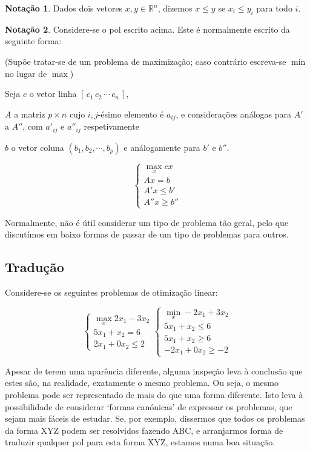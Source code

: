\documentclass{article}
\newcommand{\R}{\mathbb{R}}
\theoremstyle{definition}
\newtheorem*{notacao}{Notação}
\begin{document}
	\begin{notacao}
Dados dois vetores $x,y \in \R^n$, dizemos $x \leq y$ se $x_i \leq y_i$ para todo $i$.
	\end{notacao}
	\begin{notacao}
	Considere-se o pol escrito acima. Este é normalmente escrito da seguinte forma:
	
	(Supõe tratar-se de um problema de maximização; caso contrário escreva-se $\min$ no lugar de $\max$)
	
	Seja $c$ o vetor linha $[\,c_1\,c_2\, \cdots \,c_n\,]$,

	$A$ a matriz $p \times n$ cujo $i,j$-ésimo elemento é $a_{ij}$, e considerações análogas para $A'$ a $A''$, com $a'_{ij}$ e $a''_{ij}$ respetivamente
	
	$b$ o vetor coluna $(b_1, b_2, \cdots, b_p)$ e análogamente para $b'$ e $b''$.
	
	\[
	\begin{cases}
	\max\limits_x cx \\
	Ax = b \\
	A'x \leq b' \\
	A''x \geq b''
	\end{cases}
	\]
	\end{notacao}
	
	Normalmente, não é útil considerar um tipo de problema tão geral, pelo que discutímos em baixo formas de passar de um tipo de problemas para outros.
	
	\subsection{Tradução}
	
	Considere-se os seguintes problemas de otimização linear:
	
	\[
	\begin{cases}
	\max\limits_x 2x_1 - 3x_2 \\
	5x_1 + x_2 = 6 \\
	2x_1 + 0x_2 \leq 2
	\end{cases}
	\begin{cases}
	\min\limits_x -2x_1 + 3x_2 \\
	5x_1 + x_2 \leq 6 \\
	5x_1 + x_2 \geq 6 \\
	-2x_1 + 0x_2 \geq -2
	\end{cases}
	\]
	
	Apesar de terem uma aparência diferente, alguma inspeção leva à conclusão que estes são, na realidade, exatamente o mesmo problema. Ou seja, o mesmo problema pode ser representado de mais do que uma forma diferente. Isto leva à possibilidade de considerar `formas canónicas' de expressar os problemas, que sejam mais fáceis de estudar. Se, por exemplo, dissermos que todos os problemas da forma XYZ podem ser resolvidos fazendo ABC, e arranjarmos forma de traduzir qualquer pol para esta forma XYZ, estamos numa boa situação.
	
\end{document}
